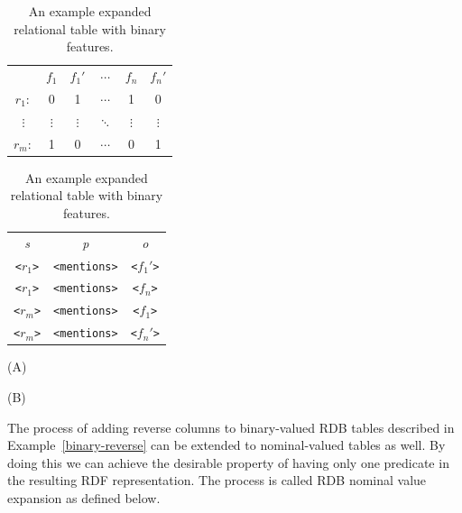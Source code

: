 \begin{table}[ht]
\begin{minipage}[b]{0.4\linewidth}\begin{flushright}
\begin{tabular}{ c | c | c | c | c | c |}
\cline{2-6}
	~   & $f_1$	 &  $f_1'$  & $\cdots$  & $f_n$  &  $f_n'$ \\
\cline{2-6}
$r_1:$	&  0  &  1	& $\cdots$   &    1  & 0\\
\cline{2-6}
$\vdots$& $\vdots$ & $\vdots$  & $\ddots$  & $\vdots$ & $\vdots$\\
\cline{2-6}
$r_m:$	&  1  &  0	& $\cdots$   &    0  & 1\\
\cline{2-6}
\end{tabular}
\end{flushright}
\end{minipage}
\hfill
\begin{minipage}[b]{0.4\linewidth}
\begin{tabular}{c c c}
\emph{s}&   \emph{p}&  \emph{o}\\
\texttt{<$r_1$>}   &    \texttt{<mentions>}   &  \texttt{<$f_1'$>}\\
\texttt{<$r_1$>}   &    \texttt{<mentions>}   &  \texttt{<$f_n$>}\\
\texttt{<$r_m$>}   &    \texttt{<mentions>}   &  \texttt{<$f_1$>}\\
\texttt{<$r_m$>}   &    \texttt{<mentions>}   &  \texttt{<$f_n'$>}\\
\end{tabular}
\end{minipage}
\hspace{1.5cm}
\begin{minipage}[c]{0.4\linewidth}\centering
\vspace{0.2cm}\hspace{2.8cm}(A)
\end{minipage}
\begin{minipage}[c]{0.4\linewidth}\centering
\vspace{0.2cm}\hspace{3.5cm}(B)
\end{minipage}
\caption{\label{tbl:binary-rel-expansion} An example expanded relational table with binary features.}
\end{table}

The process of adding reverse columns to binary-valued RDB tables described in Example~\ref{binary-reverse} can be extended to nominal-valued tables as well. By doing this we can achieve the desirable property of having only one predicate in the resulting RDF representation. The process is called RDB nominal value expansion as defined below.

